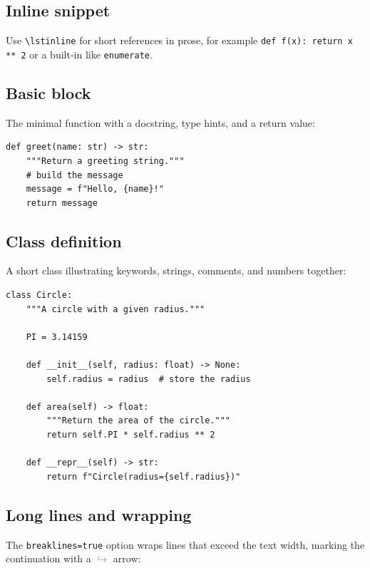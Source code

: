 \subsection{Inline snippet}

Use \verb|\lstinline| for short references in prose, for example
\lstinline|def f(x): return x ** 2| or a built-in like \lstinline|enumerate|.

\subsection{Basic block}

The minimal function with a docstring, type hints, and a return value:

\begin{lstlisting}[caption={A basic Python function}, label={lst:basic}]
def greet(name: str) -> str:
    """Return a greeting string."""
    # build the message
    message = f"Hello, {name}!"
    return message
\end{lstlisting}

\lipsum[1]

\subsection{Class definition}

A short class illustrating keywords, strings, comments, and numbers together:

\begin{lstlisting}[caption={A simple Python class}, label={lst:class}]
class Circle:
    """A circle with a given radius."""

    PI = 3.14159

    def __init__(self, radius: float) -> None:
        self.radius = radius  # store the radius

    def area(self) -> float:
        """Return the area of the circle."""
        return self.PI * self.radius ** 2

    def __repr__(self) -> str:
        return f"Circle(radius={self.radius})"
\end{lstlisting}

\lipsum[1]

\subsection{Long lines and wrapping}

The \texttt{breaklines=true} option wraps lines that exceed the text width,
marking the continuation with a \textcolor{gray}{$\hookrightarrow$} arrow:

